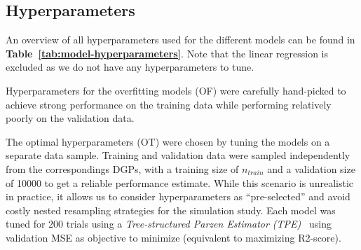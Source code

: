 \documentclass[runningheads]{llncs}
\begin{document}
\subsection{Hyperparameters}

An overview of all hyperparameters used for the different models can be found
in \textbf{Table~\ref{tab:model-hyperparameters}}. Note that the linear
regression is excluded as we do not have any hyperparameters to tune.

Hyperparameters for the overfitting models (OF) were carefully hand-picked to
achieve strong performance on the training data while performing relatively
poorly on the validation data.

The optimal hyperparameters (OT) were chosen by tuning the models on a separate
data sample. Training and validation data were sampled independently from the
correspondings DGPs, with a training size of $n_{train}$ and a validation size
of 10000 to get a reliable performance estimate. While this scenario is
unrealistic in practice, it allows us to consider hyperparameters as
``pre-selected'' and avoid costly nested resampling strategies for the
simulation study. Each model was tuned for 200 trials using a
\textit{Tree-structured Parzen Estimator (TPE)}~\cite{bergstra2011algorithms}
using validation MSE as objective to minimize (equivalent to maximizing
R2-score).
\end{document}
